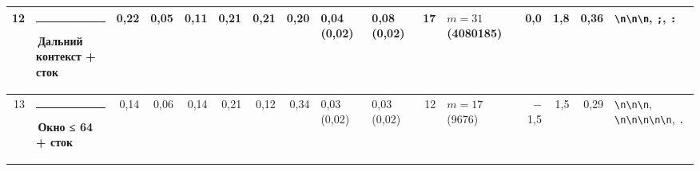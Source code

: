 \documentclass[10pt]{article}
\begin{document}
\begin{minipage}{\linewidth}
\begin{center}
{\begin{tabular}{|r|l|r|r|r|r|r|r|l|l|r|l|r|r|r|l|}
12 & \textcolor[HTML]{C3C2B7}{\rule{0.62em}{0.62em}}\,Дальний контекст + сток & 0,22 & 0,05 & 0,11 & 0,21 & 0,21 & 0,20 & 0,04 (0,02) & 0,08 (0,02) & 17 & $m{=}31$ (4080185) & 0,0 & 1,8 & 0,36 & \texttt{\textvisiblespace{}\textbackslash{}n\textbackslash{}n\textbackslash{}n}, \texttt{\textvisiblespace{};}, \texttt{\textvisiblespace{}:} \\ \hline
13 & \textcolor[HTML]{EDA100}{\rule{0.62em}{0.62em}}\,\textbf{Окно ≤ 64 + сток} & 0,14 & 0,06 & 0,14 & 0,21 & 0,12 & 0,34 & 0,03 (0,02) & 0,03 (0,02) & 12 & $m{=}17$ (9676) & $-$1,5 & 1,5 & 0,29 & \texttt{\textvisiblespace{}\textbackslash{}n\textbackslash{}n\textbackslash{}n}, \texttt{\textbackslash{}n\textbackslash{}n\textbackslash{}n\textbackslash{}n\textbackslash{}n}, \texttt{\textvisiblespace{}.} \\ \hline
\hline\end{tabular}}\end{center}
\end{minipage}
\par\vspace{0.4em}
\end{document}
